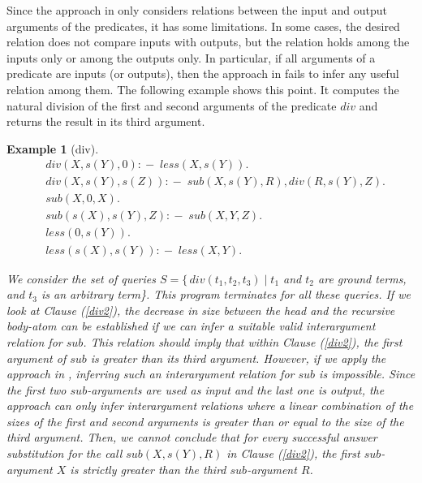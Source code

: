 \documentclass[envcountsame]{tlp}
\newcommand{\incase}{:\!\!-\;}
\newcounter{ex:der-lastsymconsctr}
\newtheorem{example}{Example}
\begin{document}
Since the approach in \cite{Decorteetal98} only considers relations between
the input and output arguments of the predicates, it has
some limitations. In some cases, the desired relation does not compare
inputs with outputs, but the relation holds among the inputs only or among 
the outputs only. In particular, if all arguments of a predicate
are inputs (or outputs), then the approach in
\cite{Decorteetal98} fails to infer any useful relation among them. The following
example shows this point. It computes the natural division of the first and second
arguments of the predicate $\mathit{div}$ and returns the result in its
third argument.

\begin{example}[div]
\label{div}
\begin{align}
    & \mathit{div}(X, s(Y), 0) \incase \mathit{less}(X,s(Y)).   \nonumber          \\
    & \mathit{div}(X, s(Y), s(Z)) \incase
        \mathit{sub}(X, s(Y), R),
        \mathit{div}(R, s(Y), Z).            \label{div2}\\
  &\mathit{sub}(X, 0, X).               \nonumber\\
  & \mathit{sub}(s(X), s(Y), Z) \incase \mathit{sub}(X, Y, Z).    \nonumber\\
 &\mathit{less}(0,s(Y)).            \nonumber\\   
    & \mathit{less}(s(X),s(Y)) \incase \mathit{less}(X,Y).   \nonumber
\end{align}

We consider the set of queries   $S=\{\,
\mathit{div}(t_1,t_2,t_3) \mid t_1$ and $t_2$ are ground terms, and $t_3$ is an arbitrary 
term\}.
This program terminates for all these queries. If we look at Clause (\ref{div2}),
the decrease in size between the head and the recursive body-atom can be established if
we can infer a suitable valid interargument relation for $\mathit{sub}$. This relation 
should imply that within Clause (\ref{div2}), the 
first argument of $\mathit{sub}$ is greater than its third argument. However, if we apply the
approach in \cite{Decorteetal98}, inferring such an interargument relation for
$\mathit{sub}$ is impossible. Since  the
first two $\mathit{sub}$-arguments are used as input and the last one is output,
the approach can only infer interargument
relations where a linear combination of the sizes of the first
and second arguments is greater than or equal to the size of the third
argument. Then, we cannot conclude 
that for every successful answer substitution for the call $\mathit{sub}(X,s(Y),R)$ in Clause
(\ref{div2}), the first $\mathit{sub}$-argument $X$ is strictly greater than the 
third $\mathit{sub}$-argument $R$.


\end{example}
\end{document}
